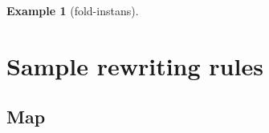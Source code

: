 \documentclass[oneside]{memoir}
\newcommand{\floor}[1]{\ensuremath{\lfloor #1 \rfloor}}
\theoremstyle{definition}
\newtheorem{example}{Example}
\begin{document}
\begin{example}[\textsf{fold}-instans]

      
    
    


  
\end{example}

\appendix

\chapter{Sample rewriting rules}

\section{Map}
\end{document}
